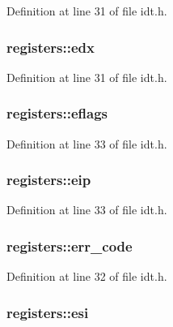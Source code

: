 Definition at line 31 of file idt.h.

\hypertarget{structregisters_a3fe3dcfbcff14bf929883527112338d2}{
\subsubsection[{edx}]{ {\bf registers::edx}}}
\label{structregisters_a3fe3dcfbcff14bf929883527112338d2}


Definition at line 31 of file idt.h.

\hypertarget{structregisters_aa4a09db03ac34c020ce8842b7724214d}{
\subsubsection[{eflags}]{ {\bf registers::eflags}}}
\label{structregisters_aa4a09db03ac34c020ce8842b7724214d}


Definition at line 33 of file idt.h.

\hypertarget{structregisters_a03c14a7c18730b4fa3fd60e9a2cfaf06}{
\subsubsection[{eip}]{ {\bf registers::eip}}}
\label{structregisters_a03c14a7c18730b4fa3fd60e9a2cfaf06}


Definition at line 33 of file idt.h.

\hypertarget{structregisters_ac97513133986d639baa5b49031b661cc}{
\subsubsection[{err\_\-code}]{ {\bf registers::err\_\-code}}}
\label{structregisters_ac97513133986d639baa5b49031b661cc}


Definition at line 32 of file idt.h.

\hypertarget{structregisters_a6adf8439e8b2f6dfbd9f3a687ccf4d14}{
\subsubsection[{esi}]{ {\bf registers::esi}}}
\label{structregisters_a6adf8439e8b2f6dfbd9f3a687ccf4d14}


